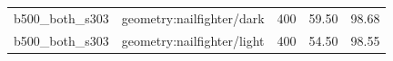 \begin{longtable}{l>{\raggedright\arraybackslash}p{.42\linewidth}rrr}
b500\_\allowbreak{}both\_\allowbreak{}s303 & %
geometry:nailfighter/dark & %
400 & %
59.50 & %
98.68 \\ %

b500\_\allowbreak{}both\_\allowbreak{}s303 & %
geometry:nailfighter/light & %
400 & %
54.50 & %
98.55 \\ %


\end{longtable}
